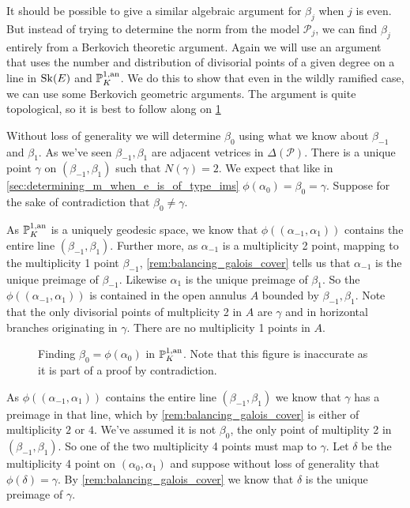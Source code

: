 It should be possible to give a similar algebraic argument for $\beta_{j}$ when $j$ is even.
But instead of trying to determine the norm from the model $\mathcal{P} _j$, we can find $\beta_j$ entirely from a Berkovich theoretic argument. 
Again we will use an argument that uses the number and distribution of divisorial points of a given degree on a line in $\operatorname{Sk}(E)$ and $\mathbb{P}^{1, \text{an}}_K$.
We do this to show that even in the wildly ramified case, we can use some Berkovich geometric arguments. 
The argument is quite topological, so it is best to follow along on \cref{fig:argument_ims_wild}

\medskip

Without loss of generality we will determine $\beta_0$ using what we know about $\beta_{-1}$ and $\beta_1$. 
As we've seen $\beta_{-1}, \beta_{1}$ are adjacent vetrices in $\Delta(\mathscr P)$. 
There is a unique point $\gamma$ on $(\beta_{-1}, \beta_1)$ such that $N(\gamma) = 2$.  
We expect that like in \cref{sec:determining_m_when_e_is_of_type_ims} $\phi(\alpha_0) = \beta_0 = \gamma$. 
Suppose for the sake of contradiction that $\beta_0 \ne \gamma$.



As $\mathbb{P}^{1, \text{an}}_K$ is a uniquely geodesic space, we know that $\phi((\alpha_{-1}, \alpha_{1}))$ contains the entire line  $(\beta_{-1}, \beta_1)$. 
Further more, as $\alpha_{-1}$ is a multiplicity 2 point, mapping to the multiplicity 1 point $\beta_{-1}$, \cref{rem:balancing_galois_cover} tells us that $\alpha_{-1}$ is the unique preimage of $\beta_{-1}$. 
Likewise $\alpha_1$ is the unique preimage of $\beta_1$. 
So the $\phi((\alpha_{-1}, \alpha_{1}))$ is contained in the open annulus $A$ bounded by $\beta_{-1}, \beta_1$.
Note that the only divisorial points of multplicity 2 in $A$ are $\gamma$ and in horizontal branches originating in $\gamma$. There are no multiplicity 1 points in  $A$. 
\begin{figure}[ht]
    \centering
    \caption{Finding $\beta_0 = \phi(\alpha_0)$ in $\mathbb{P}^{1,\text{an}}_{K}$. 
    Note that this figure is inaccurate as it is part of a proof by contradiction.}
    \label{fig:argument_ims_wild}
\end{figure}
As $\phi((\alpha_{-1}, \alpha_{1}))$ contains the entire line $(\beta_{-1}, \beta_1)$ we know that $\gamma$ has a preimage in that line, which by \cref{rem:balancing_galois_cover} is either of multiplicity $2$ or $4$. 
We've assumed it is not $\beta_0$, the only point of multiplity 2 in  $(\beta_{-1}, \beta_1)$.
So one of the two multiplicity 4 points must map to $\gamma$. 
Let $\delta$ be the multiplicity 4 point on $(\alpha_0, \alpha_1)$ and suppose without loss of generality that $\phi(\delta) = \gamma$. 
By \cref{rem:balancing_galois_cover} we know that $\delta$ is the unique preimage of $\gamma$. 

